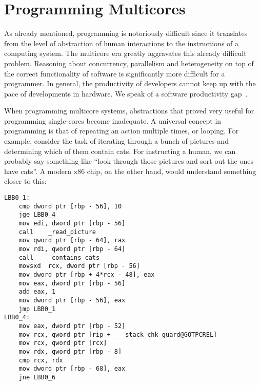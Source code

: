 \section{Programming Multicores}

As already mentioned, programming is notoriously difficult since it translates from the level of abstraction of human interactions to the instructions of a computing system.
The multicore era greatly aggravates this already difficult problem.
Reasoning about concurrency, parallelism and heterogeneity on top of the correct functionality of software is significantly more difficult for a programmer.
In general, the productivity of developers cannot keep up with the pace of developments in hardware.
We speak of a software productivity gap~\cite{castrillon2014thesis,ecker2009hardware}. 

When programming multicore systems, abstractions that proved very useful for programming single-cores become inadequate.
A universal concept in programming is that of repeating an action multiple times, or looping. 
For example, consider the task of iterating through a bunch of pictures and determining which of them contain cats.
For instructing a human, we can probably say something like ``look through those pictures and sort out the ones have cats''.
A modern x86 chip, on the other hand, would understand something closer to this:

\begin{verbatim}
LBB0_1:                                 
	cmp	dword ptr [rbp - 56], 10
	jge	LBB0_4
	mov	edi, dword ptr [rbp - 56]
	call	_read_picture
	mov	qword ptr [rbp - 64], rax
	mov	rdi, qword ptr [rbp - 64]
	call	_contains_cats
	movsxd	rcx, dword ptr [rbp - 56]
	mov	dword ptr [rbp + 4*rcx - 48], eax
	mov	eax, dword ptr [rbp - 56]
	add	eax, 1
	mov	dword ptr [rbp - 56], eax
	jmp	LBB0_1
LBB0_4:
	mov	eax, dword ptr [rbp - 52]
	mov	rcx, qword ptr [rip + ___stack_chk_guard@GOTPCREL]
	mov	rcx, qword ptr [rcx]
	mov	rdx, qword ptr [rbp - 8]
	cmp	rcx, rdx
	mov	dword ptr [rbp - 68], eax 
	jne	LBB0_6
\end{verbatim}

